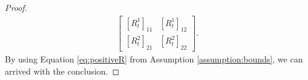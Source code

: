 \documentclass{article}
\newcommand{\transpose}{\mathsf{T}}
\begin{document}
\begin{proof}
\begin{align*}
\begin{bmatrix}
            [R_{t}^{1}]_{11} & [R_{t}^{1}]_{12}\\
            [R_{t}^{2}]_{21} & [R_{t}^{2}]_{22}
        \end{bmatrix}.
    \end{align*}
    By using Equation \eqref{eq:positiveR} from Assumption \ref{assumption:bounds}, we can arrived with the conclusion.
\end{proof}
\end{document}
